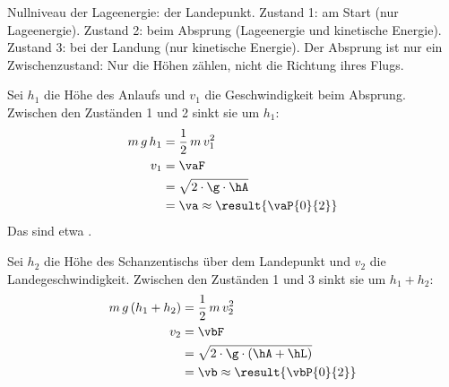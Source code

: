 Nullniveau der Lageenergie: der Landepunkt. Zustand 1: am Start (nur Lageenergie). Zustand 2: beim Absprung (Lageenergie und kinetische Energie). Zustand 3: bei der Landung (nur kinetische Energie). Der Absprung ist nur ein Zwischenzustand: Nur die Höhen zählen, nicht die Richtung ihres Flugs.

\begin{abcliste}
\abc
Sei $h_1$ die Höhe des Anlaufs und $v_1$ die Geschwindigkeit beim Absprung. Zwischen den Zuständen 1 und 2 sinkt sie um $h_1$:
\begin{align}
 m\,g\,h_1 &= \frac{1}{2}\,m\,v_1^2 \\
 v_1 &= \vaF \\
   &= \sqrt{2\cdot\g\cdot\hA} \\
   &= \va \approx \result{\vaP{0}{2}}
\end{align}
Das sind etwa .

\abc
Sei $h_2$ die Höhe des Schanzentischs über dem Landepunkt und $v_2$ die Landegeschwindigkeit. Zwischen den Zuständen 1 und 3 sinkt sie um $h_1 + h_2$:
\begin{align}
 m\,g\,(h_1+h_2) &= \frac{1}{2}\,m\,v_2^2 \\
 v_2 &= \vbF \\
   &= \sqrt{2\cdot\g\cdot(\hA+\hL)} \\
   &= \vb \approx \result{\vbP{0}{2}}
\end{align}
\end{abcliste}
